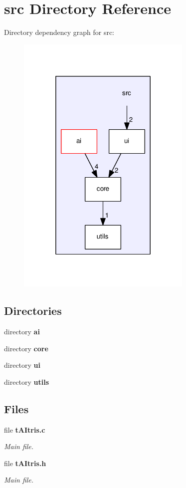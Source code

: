 \section{src Directory Reference}
\label{dir_68267d1309a1af8e8297ef4c3efbcdba}
Directory dependency graph for src\+:
\nopagebreak
\begin{figure}[H]
\begin{center}
\leavevmode
\includegraphics[width=238pt]{dir_68267d1309a1af8e8297ef4c3efbcdba_dep}
\end{center}
\end{figure}
\subsection*{Directories}
\begin{DoxyCompactItemize}
\item 
directory \textbf{ ai}
\item 
directory \textbf{ core}
\item 
directory \textbf{ ui}
\item 
directory \textbf{ utils}
\end{DoxyCompactItemize}
\subsection*{Files}
\begin{DoxyCompactItemize}
\item 
file \textbf{ t\+A\+Itris.\+c}
\begin{DoxyCompactList}\small\item\em Main file. \end{DoxyCompactList}\item 
file \textbf{ t\+A\+Itris.\+h}
\begin{DoxyCompactList}\small\item\em Main file. \end{DoxyCompactList}\end{DoxyCompactItemize}
